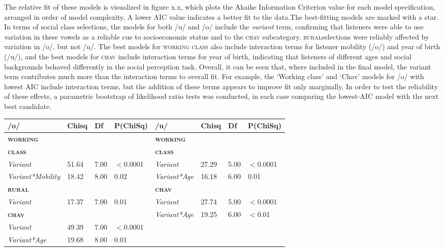\documentclass[PWPL]{article}
\begin{document}
 The relative fit of these models is visualized in figure x.x, which plots the Akaike Information Criterion value for each model specification, arranged in order of model complexity. A lower AIC value indicates a better fit to the data.The best-fitting models are marked with a star. In terms of social class selections, the models for both /u/ and /o/ include the \textit{variant} term, confirming that listeners were able to use variation in these vowels as a reliable cue to socioeconomic status and to the \textsc{chav} subcategory. \textsc{rural}selections were reliably affected by variation in /o/, but not /u/. The best models for \textsc{working class} also include interaction terms for listener mobility (/o/) and year of birth (/u/), and the best models for \textsc{chav} include interaction terms for year of birth, indicating that listeners of different ages and social backgrounds behaved differently in the social perception task. Overall, it can be seen that, where included in the final model, the variant term contributes much more than the interaction terms to overall fit. For example, the `Working class' and `Chav' models for /o/ with lowest AIC include interaction terms, but the addition of these terms appears to improve fit only marginally. In order to test the reliability of these effects, a parametric bootstrap of likelihood ratio tests was conducted, in each case comparing the lowest-AIC model with the next best candidate. 

 \begin{table}[ht]
 \scriptsize
\centering
\begin{tabular}{llllllll}
  \hline
 /o/& Chisq & Df & P(ChiSq) & /u/&Chisq & Df & P(ChiSq) \\ 
  \hline
 \textbf{\textsc{working}}&&&  &\textbf{\textsc{working}}&&&\\ 
  \textbf{\textsc{class}}&&&  & \textbf{\textsc{class}}&&&\\
  \textit{Variant}& 51.64 & 7.00 & $<$0.0001 &  \textit{Variant}& 27.29 & 5.00 & $<$0.0001 \\  
  \textit{Variant*Mobility}& 18.42 & 8.00 & 0.02 &  \textit{Variant*Age}& 16.18 & 6.00 & 0.01 \\ 
\textbf{\textsc{rural}}&&&  & \textbf{\textsc{chav}}&&&\\ 
  \textit{Variant}& 17.37 & 7.00 & 0.01 &  \textit{Variant}& 27.74 & 5.00 & $<$0.0001 \\ 
\textbf{\textsc{chav}}&&& &  \textit{Variant*Age}& 19.25 & 6.00 & $<$0.01 \\ 
  \textit{Variant}& 49.39 & 7.00 & $<$0.0001&&&& \\ 
  \textit{Variant*Age}& 19.68 & 8.00 & 0.01&&&& \\
   \hline
\end{tabular}
\end{table}
\end{document}
